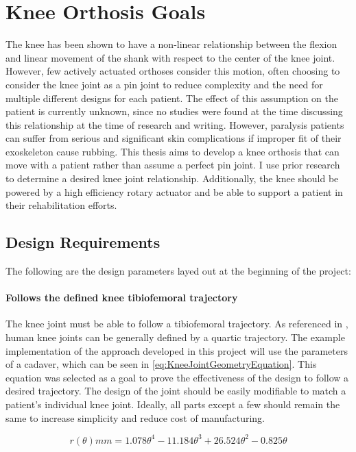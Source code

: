 \chapter{Knee Orthosis Goals}
The knee has been shown to have a non-linear relationship between the flexion and linear movement of the shank with respect to the center of the knee joint. However, few actively actuated orthoses consider this motion, often choosing to consider the knee joint as a pin joint to reduce complexity and the need for multiple different designs for each patient. The effect of this assumption on the patient is currently unknown, since no studies were found at the time discussing this relationship at the time of research and writing. However, paralysis patients can suffer from serious and significant skin complications if improper fit of their exoskeleton cause rubbing. This thesis aims to develop a knee orthosis that can move with a patient rather than assume a perfect pin joint. I use prior research to determine a desired knee joint relationship. Additionally, the knee should be powered by a high efficiency rotary actuator and be able to support a patient in their rehabilitation efforts.

\section{Design Requirements}
\label{sec:DesignParams}
The following are the design parameters layed out at the beginning of the project:

\subsubsection{Follows the defined knee tibiofemoral trajectory}
The knee joint must be able to follow a tibiofemoral trajectory. As referenced in \cite{KinDynKneeJoint}, human knee joints can be generally defined by a quartic trajectory. The example implementation of the approach developed in this project will use the parameters of a cadaver, which can be seen in \autoref{eq:KneeJointGeometryEquation}. This equation was selected as a goal to prove the effectiveness of the design to follow a desired trajectory. The design of the joint should be easily modifiable to match a patient's individual knee joint. Ideally, all parts except a few should remain the same to increase simplicity and reduce cost of manufacturing.

\begin{equation}
    r(\theta) mm = 1.078\theta^4 - 11.184\theta^3 + 26.524\theta^2 - 0.825\theta
    \label{eq:KneeJointGeometryEquation}
\end{equation}

